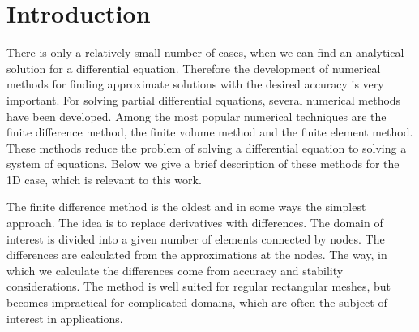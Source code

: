 \documentclass[../include.tex]{subfiles}
\begin{document}
\section{Introduction}
\par There is only a relatively small number of cases, when we can find an analytical solution for a differential equation. Therefore the development of numerical methods for finding approximate solutions with the desired accuracy is very important. For solving partial differential equations, several numerical methods have been developed. Among the most popular numerical techniques are the finite difference method, the finite volume method and the finite element method. These methods reduce the problem of solving a differential equation to solving a system of equations. Below we give a brief description of these methods for the 1D case, which is relevant to this work.

The finite difference method \cite{lev_fdm} is the oldest and in some ways the simplest approach. The idea is to replace derivatives with differences. The domain of interest is divided into a given number of elements connected by nodes. The differences are calculated from the approximations at the nodes. The way, in which we calculate the differences come from accuracy and stability considerations. The method is well suited for regular rectangular meshes, but becomes impractical for complicated domains, which are often the subject of interest in applications.
\end{document}
